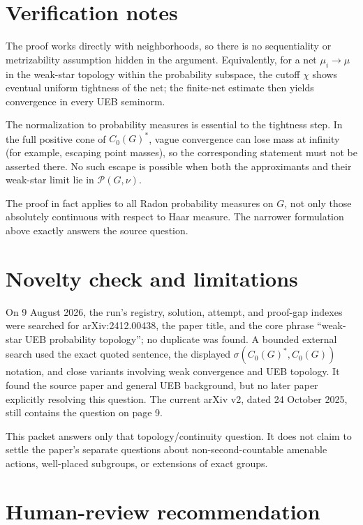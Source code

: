 \documentclass[11pt]{article}
\newcommand{\Prob}{\mathcal P}
\begin{document}
\section{Verification notes}

The proof works directly with neighborhoods, so there is no sequentiality or
metrizability assumption hidden in the argument.  Equivalently, for a net
$\mu_i\to\mu$ in the weak-star topology within the probability subspace, the
cutoff $\chi$ shows eventual uniform tightness of the net; the finite-net
estimate then yields convergence in every UEB seminorm.

The normalization to probability measures is essential to the tightness
step.  In the full positive cone of $C_0(G)^*$, vague convergence can lose
mass at infinity (for example, escaping point masses), so the corresponding
statement must not be asserted there.  No such escape is possible when both
the approximants and their weak-star limit lie in $\Prob(G,\nu)$.

The proof in fact applies to all Radon probability measures on $G$, not only
those absolutely continuous with respect to Haar measure.  The narrower
formulation above exactly answers the source question.

\section{Novelty check and limitations}

On 9 August 2026, the run's registry, solution, attempt, and proof-gap indexes
were searched for arXiv:2412.00438, the paper title, and the core phrase
``weak-star UEB probability topology''; no duplicate was found.  A bounded
external search used the exact quoted sentence, the displayed
$\sigma(C_0(G)^*,C_0(G))$ notation, and close variants involving weak
convergence and UEB topology.  It found the source paper and general UEB
background, but no later paper explicitly resolving this question.  The
current arXiv v2, dated 24 October 2025, still contains the question on page 9.

This packet answers only that topology/continuity question.  It does not
claim to settle the paper's separate questions about non-second-countable
amenable actions, well-placed subgroups, or extensions of exact groups.

\section{Human-review recommendation}
\end{document}
